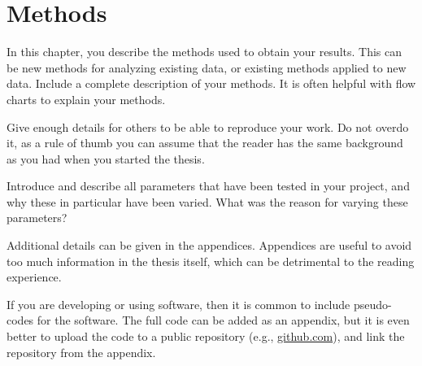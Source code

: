 \chapter{Methods}

In this chapter, you describe the methods used to obtain your results. This can be new methods for analyzing existing data, or existing methods applied to new data. Include a complete description of your methods. It is often helpful with flow charts to explain your methods.

Give enough details for others to be able to reproduce your work. Do not overdo it, as a rule of thumb you can assume that the reader has the same background as you had when you started the thesis.

Introduce and describe all parameters that have been tested in your project, and why these in particular have been varied. What was the reason for varying these parameters?

Additional details can be given in the appendices. Appendices are useful to avoid too much information in the thesis itself, which can be detrimental to the reading experience.

If you are developing or using software, then it is common to include pseudo-codes for the software. The full code can be added as an appendix, but it is even better to upload the code to a public repository (e.g., \url{github.com}), and link the repository from the appendix.

